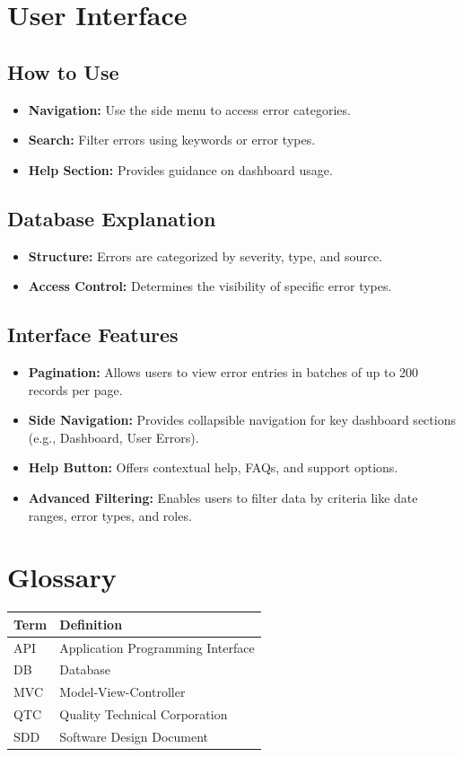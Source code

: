 \documentclass[12pt]{article}
\begin{document}
\newpage

\section{User Interface}
\subsection{How to Use}
\begin{itemize}
    \item \textbf{Navigation:} Use the side menu to access error categories.
    \item \textbf{Search:} Filter errors using keywords or error types.
    \item \textbf{Help Section:} Provides guidance on dashboard usage.
\end{itemize}

\subsection{Database Explanation}
\begin{itemize}
    \item \textbf{Structure:} Errors are categorized by severity, type, and source.
    \item \textbf{Access Control:} Determines the visibility of specific error types.
\end{itemize}

\subsection{Interface Features}
\begin{itemize}
    \item \textbf{Pagination:} Allows users to view error entries in batches of up to 200 records per page.
    \item \textbf{Side Navigation:} Provides collapsible navigation for key dashboard sections (e.g., Dashboard, User Errors).
    \item \textbf{Help Button:} Offers contextual help, FAQs, and support options.
    \item \textbf{Advanced Filtering:} Enables users to filter data by criteria like date ranges, error types, and roles.
\end{itemize}

\newpage

\section{Glossary}
\begin{tabular}{|l|p{10cm}|}
\hline
\textbf{Term} & \textbf{Definition} \\ \hline
API & Application Programming Interface \\ \hline
DB & Database \\ \hline
MVC & Model-View-Controller \\ \hline
QTC & Quality Technical Corporation \\ \hline
SDD & Software Design Document \\ \hline
\end{tabular}
\end{document}
